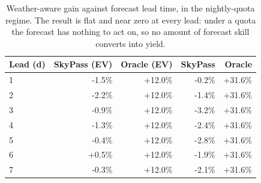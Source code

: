 \begin{table}[t]
\caption{Weather-aware gain against forecast lead time, in the nightly-quota regime. The result is flat and near zero at every lead: under a quota the forecast has nothing to act on, so no amount of forecast skill converts into yield.}
\label{tab:leadsweep}
\centering
\begin{tabular}{lrrrr}
\toprule
Lead (d) & SkyPass (EV) & Oracle (EV) & SkyPass & Oracle \\
\midrule
1 & -1.5\% & +12.0\% & -0.2\% & +31.6\% \\
2 & -2.2\% & +12.0\% & -1.4\% & +31.6\% \\
3 & -0.9\% & +12.0\% & -3.2\% & +31.6\% \\
4 & -1.3\% & +12.0\% & -2.4\% & +31.6\% \\
5 & -0.4\% & +12.0\% & -2.8\% & +31.6\% \\
6 & +0.5\% & +12.0\% & -1.9\% & +31.6\% \\
7 & -0.3\% & +12.0\% & -2.1\% & +31.6\% \\
\bottomrule
\end{tabular}
\end{table}
